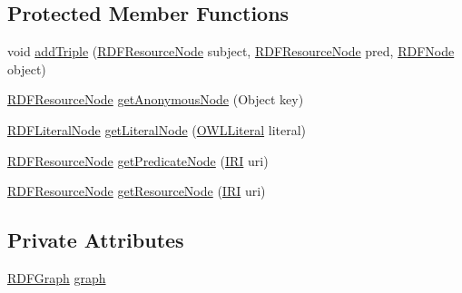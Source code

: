 \subsection*{Protected Member Functions}
\begin{DoxyCompactItemize}
\item 
void \hyperlink{classorg_1_1coode_1_1owlapi_1_1rdf_1_1model_1_1_r_d_f_translator_ac95ace302697e45c9feec4c98fb97d6a}{add\-Triple} (\hyperlink{classorg_1_1coode_1_1owlapi_1_1rdf_1_1model_1_1_r_d_f_resource_node}{R\-D\-F\-Resource\-Node} subject, \hyperlink{classorg_1_1coode_1_1owlapi_1_1rdf_1_1model_1_1_r_d_f_resource_node}{R\-D\-F\-Resource\-Node} pred, \hyperlink{classorg_1_1coode_1_1owlapi_1_1rdf_1_1model_1_1_r_d_f_node}{R\-D\-F\-Node} object)
\item 
\hyperlink{classorg_1_1coode_1_1owlapi_1_1rdf_1_1model_1_1_r_d_f_resource_node}{R\-D\-F\-Resource\-Node} \hyperlink{classorg_1_1coode_1_1owlapi_1_1rdf_1_1model_1_1_r_d_f_translator_af5bb9b3c74754579c5d5ab7a6c232a88}{get\-Anonymous\-Node} (Object key)
\item 
\hyperlink{classorg_1_1coode_1_1owlapi_1_1rdf_1_1model_1_1_r_d_f_literal_node}{R\-D\-F\-Literal\-Node} \hyperlink{classorg_1_1coode_1_1owlapi_1_1rdf_1_1model_1_1_r_d_f_translator_a065de1b9172e36c64cb75c992b49a6a1}{get\-Literal\-Node} (\hyperlink{interfaceorg_1_1semanticweb_1_1owlapi_1_1model_1_1_o_w_l_literal}{O\-W\-L\-Literal} literal)
\item 
\hyperlink{classorg_1_1coode_1_1owlapi_1_1rdf_1_1model_1_1_r_d_f_resource_node}{R\-D\-F\-Resource\-Node} \hyperlink{classorg_1_1coode_1_1owlapi_1_1rdf_1_1model_1_1_r_d_f_translator_a10cbb0c8ffc0ecd97dab4d7904c4b62d}{get\-Predicate\-Node} (\hyperlink{classorg_1_1semanticweb_1_1owlapi_1_1model_1_1_i_r_i}{I\-R\-I} uri)
\item 
\hyperlink{classorg_1_1coode_1_1owlapi_1_1rdf_1_1model_1_1_r_d_f_resource_node}{R\-D\-F\-Resource\-Node} \hyperlink{classorg_1_1coode_1_1owlapi_1_1rdf_1_1model_1_1_r_d_f_translator_a7b3bedb962cf88526399da2541151f2e}{get\-Resource\-Node} (\hyperlink{classorg_1_1semanticweb_1_1owlapi_1_1model_1_1_i_r_i}{I\-R\-I} uri)
\end{DoxyCompactItemize}
\subsection*{Private Attributes}
\begin{DoxyCompactItemize}
\item 
\hyperlink{classorg_1_1coode_1_1owlapi_1_1rdf_1_1model_1_1_r_d_f_graph}{R\-D\-F\-Graph} \hyperlink{classorg_1_1coode_1_1owlapi_1_1rdf_1_1model_1_1_r_d_f_translator_adb4f44346cf0c867acf5dfdb1c2fb2fc}{graph}
\end{DoxyCompactItemize}


